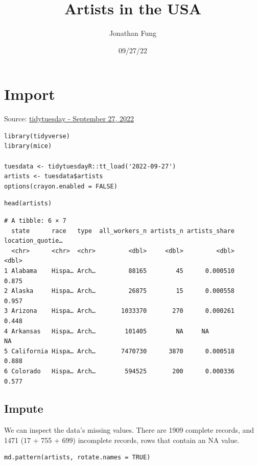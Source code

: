 \documentclass[8pt]{article}
\author{Jonathan Fung}
\date{09/27/22}
\title{Artists in the USA}
\begin{document}
\maketitle
\tableofcontents

\begin{latex}
\pagebreak
\end{latex}
\section{Import}
\label{sec:org3e9438a}
Source: \href{https://github.com/rfordatascience/tidytuesday/tree/master/data/2022/2022-09-27}{tidytuesday - September 27, 2022}

\begin{verbatim}
library(tidyverse)
library(mice)

tuesdata <- tidytuesdayR::tt_load('2022-09-27')
artists <- tuesdata$artists
options(crayon.enabled = FALSE)
\end{verbatim}

\begin{verbatim}
head(artists)
\end{verbatim}

\begin{verbatim}
# A tibble: 6 × 7
  state      race   type  all_workers_n artists_n artists_share location_quotie…
  <chr>      <chr>  <chr>         <dbl>     <dbl>         <dbl>            <dbl>
1 Alabama    Hispa… Arch…         88165        45      0.000510            0.875
2 Alaska     Hispa… Arch…         26875        15      0.000558            0.957
3 Arizona    Hispa… Arch…       1033370       270      0.000261            0.448
4 Arkansas   Hispa… Arch…        101405        NA     NA                  NA
5 California Hispa… Arch…       7470730      3870      0.000518            0.888
6 Colorado   Hispa… Arch…        594525       200      0.000336            0.577
\end{verbatim}

\begin{latex}
\pagebreak
\end{latex}
\subsection{Impute}
\label{sec:org372c113}
We can inspect the data's missing values. There are 1909 complete records, and 1471 (17 + 755 + 699) incomplete records, rows that contain an NA value.

\begin{verbatim}
md.pattern(artists, rotate.names = TRUE)
\end{verbatim}
\end{document}
